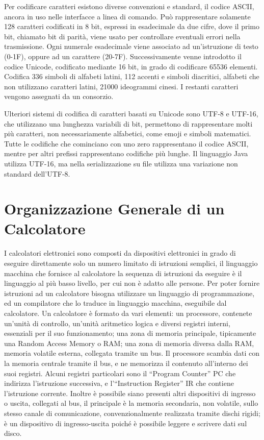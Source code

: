\documentclass{article}
\numberwithin{equation}{subsection}
\begin{document}
Per codificare caratteri esistono diverse convenzioni e standard, il codice ASCII, ancora in uso nelle interfacce a linea di comando. Può rappresentare solamente 128 caratteri codificati in 8 bit, espressi in 
esadecimale da due cifre, dove il primo bit, chiamato bit di parità, viene usato per controllare eventuali errori nella trasmissione. Ogni numerale esadecimale viene associato ad un'istruzione di testo (0-1F), 
oppure ad un carattere (20-7F). 
Successivamente venne introdotto il codice Unicode, codificato mediante 16 bit, in grado di codificare 65536 elementi. Codifica 336 simboli di alfabeti latini, 112 accenti e simboli diacritici, alfabeti che non 
utilizzano caratteri latini, 21000 ideogrammi cinesi. I restanti caratteri vengono assegnati da un consorzio. 

Ulteriori sistemi di codifica di caratteri basati su Unicode sono UTF-8 e UTF-16, che utilizzano una lunghezza variabili di bit, permettono di rappresentare molti più caratteri, non necessariamente alfabetici, come 
emoji e simboli matematici. Tutte le codifiche che cominciano con uno zero rappresentano il codice ASCII, mentre per altri prefissi rappresentano codifiche più lunghe. 
Il linguaggio Java utilizza UTF-16, ma nella serializzazione su file utilizza una variazione non standard dell'UTF-8. 

\clearpage

\section{Organizzazione Generale di un Calcolatore}

I calcolatori elettronici sono composti da dispositivi elettronici in grado di eseguire direttamente solo un numero limitato di istruzioni semplici, il linguaggio macchina che fornisce al calcolatore la sequenza di 
istruzioni da eseguire è il linguaggio al più basso livello, per cui non è adatto alle persone. Per poter fornire istruzioni ad un calcolatore bisogna utilizzare un linguaggio di 
programmazione, ed un compilatore che lo traduce in linguaggio macchina, eseguibile dal calcolatore. 
Un calcolatore è formato da vari elementi: un processore, contenete un'unità di controllo, un'unità aritmetico logica e diversi 
registri interni, essenziali per il suo funzionamento; una zona di memoria principale, tipicamente una Random Access Memory o RAM; una zona di memoria diversa dalla RAM, memoria volatile esterna, collegata tramite 
un bus. Il processore scambia dati con la memoria centrale tramite il bus, e ne memorizza il contenuto all'interno dei suoi registri. Alcuni registri particolari sono il ``Program Counter'' PC che indirizza l'istruzione 
successiva, e l'``Instruction Register'' IR che contiene l'istruzione corrente. Inoltre è possibile siano presenti altri dispositivi di ingresso o uscita, collegati al bus, il principale è la memoria secondaria, non 
volatile, sullo stesso canale di comunicazione, convenzionalmente realizzata tramite dischi rigidi; è un dispositivo di ingresso-uscita poiché è possibile leggere e scrivere dati sul disco.
\end{document}
